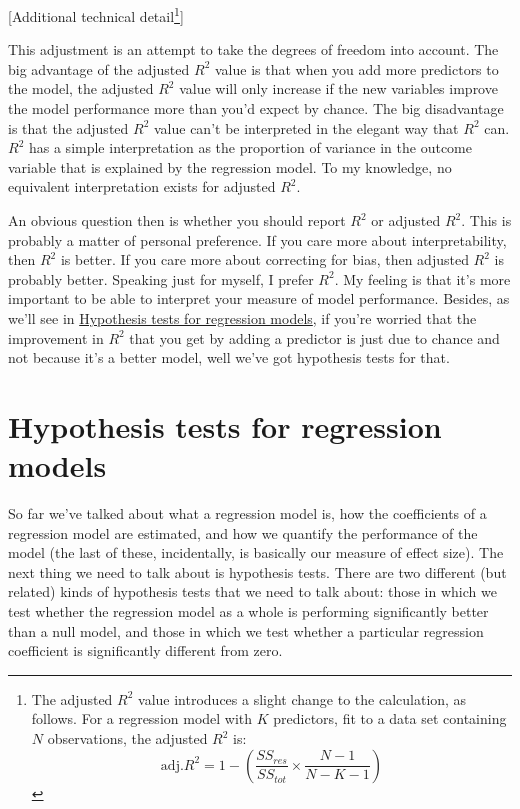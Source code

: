 \documentclass[
  a4paper,
]{book}
\begin{document}
{[}Additional technical detail\footnote{The adjusted \(R^2\) value
  introduces a slight change to the calculation, as follows. For a
  regression model with \(K\) predictors, fit to a data set containing
  \(N\) observations, the adjusted \(R^2\) is:
  \[\text{adj.}R^2=1-(\frac{SS_{res}}{SS_{tot}} \times \frac{N-1}{N-K-1})\]}{]}

This adjustment is an attempt to take the degrees of freedom into
account. The big advantage of the adjusted \(R^2\) value is that when
you add more predictors to the model, the adjusted \(R^2\) value will
only increase if the new variables improve the model performance more
than you'd expect by chance. The big disadvantage is that the adjusted
\(R^2\) value can't be interpreted in the elegant way that \(R^2\) can.
\(R^2\) has a simple interpretation as the proportion of variance in the
outcome variable that is explained by the regression model. To my
knowledge, no equivalent interpretation exists for adjusted \(R^2\).

An obvious question then is whether you should report \(R^2\) or
adjusted \(R^2\). This is probably a matter of personal preference. If
you care more about interpretability, then \(R^2\) is better. If you
care more about correcting for bias, then adjusted \(R^2\) is probably
better. Speaking just for myself, I prefer \(R^2\). My feeling is that
it's more important to be able to interpret your measure of model
performance. Besides, as we'll see in
\protect\hyperlink{hypothesis-tests-for-regression-models}{Hypothesis
tests for regression models}, if you're worried that the improvement in
\(R^2\) that you get by adding a predictor is just due to chance and not
because it's a better model, well we've got hypothesis tests for that.

\hypertarget{hypothesis-tests-for-regression-models}{%
\section{Hypothesis tests for regression
models}\label{hypothesis-tests-for-regression-models}}

So far we've talked about what a regression model is, how the
coefficients of a regression model are estimated, and how we quantify
the performance of the model (the last of these, incidentally, is
basically our measure of effect size). The next thing we need to talk
about is hypothesis tests. There are two different (but related) kinds
of hypothesis tests that we need to talk about: those in which we test
whether the regression model as a whole is performing significantly
better than a null model, and those in which we test whether a
particular regression coefficient is significantly different from zero.
\end{document}
